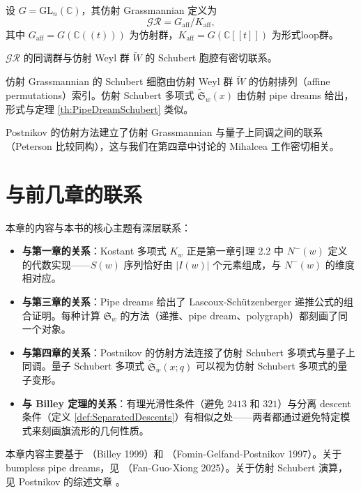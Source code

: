 设 $G = \mathrm{GL}_n(\mathbb{C})$，其仿射 Grassmannian 定义为
$$\mathcal{GR} = G_{\mathrm{aff}} / K_{\mathrm{aff}},$$
其中 $G_{\mathrm{aff}} = G(\mathbb{C}((t)))$ 为仿射群，$K_{\mathrm{aff}} = G(\mathbb{C}[[t]])$ 为形式loop群。

$\mathcal{GR}$ 的同调群与仿射 Weyl 群 $\widetilde{W}$ 的 Schubert 胞腔有密切联系。

\begin{Theorem}[Postnikov, 2002]
仿射 Grassmannian 的 Schubert 细胞由仿射 Weyl 群 $\widetilde{W}$ 的仿射排列（affine permutations）索引。仿射 Schubert 多项式 $\widetilde{\mathfrak{S}}_w(x)$ 由仿射 pipe dreams 给出，形式与定理 \ref{th:PipeDreamSchubert} 类似。
\end{Theorem}

Postnikov 的仿射方法建立了仿射 Grassmannian 与量子上同调之间的联系（Peterson 比较同构），这与我们在第四章中讨论的 Mihalcea 工作密切相关。

\section{与前几章的联系}

本章的内容与本书的核心主题有深层联系：

\begin{itemize}
\item \textbf{与第一章的关系}：Kostant 多项式 $K_w$ 正是第一章引理 2.2 中 $N^-(w)$ 定义的代数实现——$S(w)$ 序列恰好由 $|I(w)|$ 个元素组成，与 $N^-(w)$ 的维度相对应。

\item \textbf{与第三章的关系}：Pipe dreams 给出了 Lascoux-Schützenberger 递推公式的组合证明。每种计算 $\mathfrak{S}_w$ 的方法（递推、pipe dream、polygraph）都刻画了同一个对象。

\item \textbf{与第四章的关系}：Postnikov 的仿射方法连接了仿射 Schubert 多项式与量子上同调。量子 Schubert 多项式 $\widetilde{\mathfrak{S}}_w(x; q)$ 可以视为仿射 Schubert 多项式的量子变形。

\item \textbf{与 Billey 定理的关系}：有理光滑性条件（避免 $2413$ 和 $321$）与分离 descent 条件（定义 \ref{def:SeparatedDescents}）有相似之处——两者都通过避免特定模式来刻画旗流形的几何性质。
\end{itemize}

\begin{Remark}
本章内容主要基于 \cite{billey1999}（Billey 1999）和 \cite{FominGelfandPostnikov1997}（Fomin-Gelfand-Postnikov 1997）。关于 bumpless pipe dreams，见 \cite{FGL2025}（Fan-Guo-Xiong 2025）。关于仿射 Schubert 演算，见 Postnikov 的综述文章 \cite{FominGelfandPostnikov1997}。
\end{Remark}

